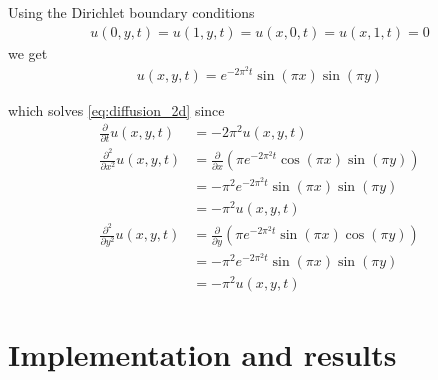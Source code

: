 \documentclass[10pt,a4paper]{article}
\newcommand{\fracpt}{\frac{\partial}{\partial t}}
\newcommand{\fracpx}{\frac{\partial}{\partial x}}
\newcommand{\fracpy}{\frac{\partial}{\partial y}}
\newcommand{\fracpxx}{\frac{\partial^2}{\partial x^2}}
\newcommand{\fracpyy}{\frac{\partial^2}{\partial y^2}}
\begin{document}
Using the Dirichlet boundary conditions
\begin{align}
u(0, y, t) = u(1, y, t) = u(x, 0, t) = u(x, 1, t) = 0
\end{align}
we get
\begin{align}\label{eq:analytical_2d}
    u(x, y, t) = e^{-2\pi^2 t} \sin(\pi x) \sin(\pi y)
\end{align}

which solves \vref{eq:diffusion_2d} since
\begin{align}
\fracpt u(x, y, t) &= -2\pi^2 u(x, y, t) \\
\fracpxx u(x, y, t) &= \fracpx \left( \pi e^{-2\pi^2 t} \cos(\pi x) \sin(\pi y) \right) \\
&= -\pi^2 e^{-2\pi^2 t} \sin(\pi x) \sin(\pi y) \\
&= -\pi^2 u(x, y, t) \\
\fracpyy u(x, y, t) &= \fracpy \left( \pi e^{-2\pi^2 t} \sin(\pi x) \cos(\pi y) \right) \\
&= -\pi^2 e^{-2\pi^2 t} \sin(\pi x) \sin(\pi y) \\
&= -\pi^2 u(x, y, t)
\end{align}

\section{Implementation and results}\label{sec:implementation_and_results}




{}
\end{document}
